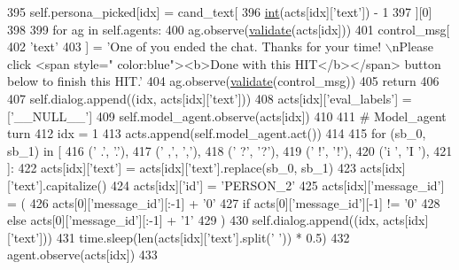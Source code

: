 \begin{DoxyCode}
395                             self.persona\_picked[idx] = cand\_text[
396                                 \hyperlink{namespacelanguage__model_1_1eval__ppl_a7d12ee00479673c5c8d1f6d01faa272a}{int}(acts[idx][\textcolor{stringliteral}{'text'}]) - 1
397                             ][0]
398 
399                     \textcolor{keywordflow}{for} ag \textcolor{keywordflow}{in} self.agents:
400                         ag.observe(\hyperlink{namespaceparlai_1_1core_1_1worlds_afc3fad603b7bce41dbdc9cdc04a9c794}{validate}(acts[idx]))
401                         control\_msg[
402                             \textcolor{stringliteral}{'text'}
403                         ] = \textcolor{stringliteral}{'One of you ended the chat. Thanks for your time! \(\backslash\)nPlease click <span style="
      color:blue"><b>Done with this HIT</b></span> button below to finish this HIT.'}
404                         ag.observe(\hyperlink{namespaceparlai_1_1core_1_1worlds_afc3fad603b7bce41dbdc9cdc04a9c794}{validate}(control\_msg))
405                 \textcolor{keywordflow}{return}
406 
407             self.dialog.append((idx, acts[idx][\textcolor{stringliteral}{'text'}]))
408             acts[idx][\textcolor{stringliteral}{'eval\_labels'}] = [\textcolor{stringliteral}{'\_\_NULL\_\_'}]
409             self.model\_agent.observe(acts[idx])
410 
411         \textcolor{comment}{# Model\_agent turn}
412         idx = 1
413         acts.append(self.model\_agent.act())
414 
415         \textcolor{keywordflow}{for} (sb\_0, sb\_1) \textcolor{keywordflow}{in} [
416             (\textcolor{stringliteral}{' .'}, \textcolor{stringliteral}{'.'}),
417             (\textcolor{stringliteral}{' ,'}, \textcolor{stringliteral}{','}),
418             (\textcolor{stringliteral}{' ?'}, \textcolor{stringliteral}{'?'}),
419             (\textcolor{stringliteral}{' !'}, \textcolor{stringliteral}{'!'}),
420             (\textcolor{stringliteral}{'i '}, \textcolor{stringliteral}{'I '}),
421         ]:
422             acts[idx][\textcolor{stringliteral}{'text'}] = acts[idx][\textcolor{stringliteral}{'text'}].replace(sb\_0, sb\_1)
423         acts[idx][\textcolor{stringliteral}{'text'}].capitalize()
424         acts[idx][\textcolor{stringliteral}{'id'}] = \textcolor{stringliteral}{'PERSON\_2'}
425         acts[idx][\textcolor{stringliteral}{'message\_id'}] = (
426             acts[0][\textcolor{stringliteral}{'message\_id'}][:-1] + \textcolor{stringliteral}{'0'}
427             \textcolor{keywordflow}{if} acts[0][\textcolor{stringliteral}{'message\_id'}][-1] != \textcolor{stringliteral}{'0'}
428             \textcolor{keywordflow}{else} acts[0][\textcolor{stringliteral}{'message\_id'}][:-1] + \textcolor{stringliteral}{'1'}
429         )
430         self.dialog.append((idx, acts[idx][\textcolor{stringliteral}{'text'}]))
431         time.sleep(len(acts[idx][\textcolor{stringliteral}{'text'}].split(\textcolor{stringliteral}{' '})) * 0.5)
432         agent.observe(acts[idx])
433 
\end{DoxyCode}
